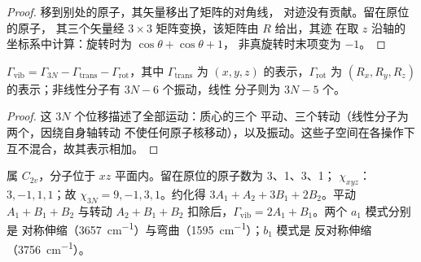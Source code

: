 \begin{proof}
移到别处的原子，其矢量移出了矩阵的对角线，
对迹没有贡献。留在原位的原子，
其三个矢量经 $3\times3$ 矩阵变换，该矩阵由 $R$ 给出，其迹
在取 $z$ 沿轴的坐标系中计算：旋转时为 $\cos\theta + \cos\theta + 1$，
非真旋转时末项变为 $-1$。
\end{proof}

\begin{proposition}[振动计数]\label{prop:b3:group-theory-applied:mode-count}
$\Gamma_{\mathrm{vib}} = \Gamma_{3N} - \Gamma_{\mathrm{trans}} - \Gamma_{\mathrm{rot}}$，其中
$\Gamma_{\mathrm{trans}}$ 为 $(x, y, z)$ 的表示，$\Gamma_{\mathrm{rot}}$ 为
$(R_x, R_y, R_z)$ 的表示；非线性分子有 $3N - 6$ 个振动，线性
分子则为 $3N - 5$ 个。
\end{proposition}

\begin{proof}
这 $3N$ 个位移描述了全部运动：质心的三个
平动、三个转动（线性分子为两个，因绕自身轴转动
不使任何原子核移动），以及振动。这些子空间在各操作下
互不混合，故其表示相加。
\end{proof}

\begin{example}[水]\label{ex:b3:group-theory-applied:water}
 属 $C_{2v}$，分子位于 $xz$ 平面内。留在原位的原子数为 3、1、3、1；
$\chi_{xyz}$：$3, -1, 1, 1$；故 $\chi_{3N} = 9, -1, 3, 1$。约化得 $3A_1 +
A_2 + 3B_1 + 2B_2$。平动 $A_1 + B_1 + B_2$ 与转动 $A_2 + B_1 + B_2$
扣除后，$\Gamma_{\mathrm{vib}} = 2A_1 + B_1$。两个 $a_1$ 模式分别是
对称伸缩（\qty{3657}{cm^{-1}}）与弯曲（\qty{1595}{cm^{-1}}）；$b_1$ 模式是
反对称伸缩（\qty{3756}{cm^{-1}}）。
\end{example}

